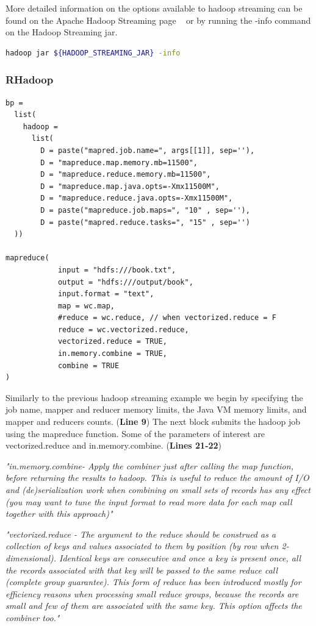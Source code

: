 \documentclass[
journal=jacsat, %
manuscript=article]{achemso}
\begin{document}
More detailed information on the options available to hadoop streaming can be found on the Apache Hadoop Streaming page ~\cite{Apache} or by running the -info command on the Hadoop Streaming jar.

\begin{lstlisting}[language=bash]
hadoop jar ${HADOOP_STREAMING_JAR} -info

\end{lstlisting}


\subsubsection{RHadoop}

\begin{lstlisting}
bp =
  list(
    hadoop =
      list(
        D = paste("mapred.job.name=", args[[1]], sep=''),
        D = "mapreduce.map.memory.mb=11500",
        D = "mapreduce.reduce.memory.mb=11500",
        D = "mapreduce.map.java.opts=-Xmx11500M",
        D = "mapreduce.reduce.java.opts=-Xmx11500M",
        D = paste("mapreduce.job.maps=", "10" , sep=''),
        D = paste("mapred.reduce.tasks=", "15" , sep='')
  ))

mapreduce(
            input = "hdfs:///book.txt",
            output = "hdfs:///output/book",
            input.format = "text",
            map = wc.map,
            #reduce = wc.reduce, // when vectorized.reduce = F
            reduce = wc.vectorized.reduce, 
            vectorized.reduce = TRUE,
            in.memory.combine = TRUE,
            combine = TRUE
)
\end{lstlisting}
Similarly to the previous hadoop streaming example we begin by specifying the job name, mapper and reducer memory limits, the Java VM memory limits, and mapper and reducers counts. (\textbf{Line 9})
The next block submits the hadoop job using the mapreduce function. Some of the parameters of interest are vectorized.reduce and in.memory.combine. (\textbf{Lines 21-22}) 

\textit{"in.memory.combine- Apply the combiner just after calling the map function, before returning the results to hadoop. This is useful to reduce the amount of I/O and (de)serialization work when combining on small sets of records has any effect (you may want to tune the input format to read more data for each map call together with this approach)"} 

\textit{"vectorized.reduce - The argument to the reduce should be construed as a collection of keys and values associated to them by position (by row when 2-dimensional). Identical keys are consecutive and once a key is present once, all the records associated with that key will be passed to the same reduce call (complete group guarantee). This form of reduce has been introduced mostly for efficiency reasons when processing small reduce groups, because the records are small and few of them are associated with the same key. This option affects the combiner too."}
~\cite{RHADOOP_DOC}
\end{document}
